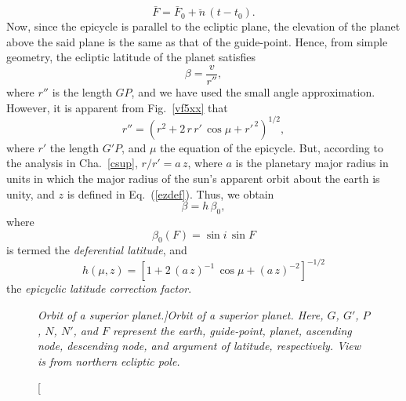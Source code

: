 \begin{equation}
\bar{F}  = \bar{F}_0 + \breve{n}\,(t-t_0).
\end{equation}
 Now, since the epicycle is parallel to the ecliptic
plane, the elevation of the planet above the said plane is
the same as that of the guide-point. Hence, from simple geometry, the ecliptic latitude of the planet satisfies
\begin{equation}
\beta = \frac{v}{r''},
\end{equation}
where $r''$ is the length $GP$, and
we have used the small angle approximation. However, it is apparent from Fig.~\ref{vf5xx} that
\begin{equation}
r'' = (r^2 + 2\,r\,r'\,\cos\mu+ r'^{\,2})^{1/2},
\end{equation}
where $r'$ the length $G'P$, and $\mu$ the
equation of the epicycle. But, according to the analysis in Cha.~\ref{csup}, $r/r' = a\,z$, where $a$ is the planetary
major radius in units in which the major radius of the sun's apparent orbit
about the earth is unity, and $z$ is defined in Eq.~(\ref{ezdef}).
Thus, we obtain
\begin{equation}
\beta =h\,\beta_0,
\end{equation}
where
\begin{equation}
\beta_0(F) = \sin i\,\sin F
\end{equation}
is termed the {\em  deferential latitude},
and
\begin{equation}
h(\mu,z) = \left[1 + 2\,(a\,z)^{-1}\,\cos\mu+ (a\,z)^{-2}\right]^{-1/2}
\end{equation}
the {\em epicyclic latitude correction factor}.

\begin{figure}[h]
\epsfysize=3in
\centerline{}
\caption[\em Orbit of a superior planet.]{\em Orbit of a superior planet. Here, $G$, $G'$, $P$, 
$N$, $N'$,  and $F$ represent the earth, guide-point,
planet, ascending node, descending node, and argument of latitude, respectively. View is from northern
ecliptic pole.}\label{flong}
\end{figure}

